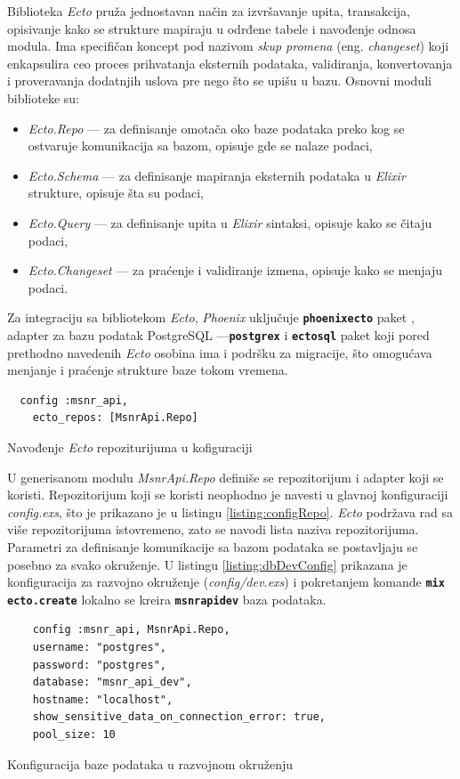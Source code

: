 \documentclass[12pt,oneside]{memoir}
\begin{document}
Biblioteka \emph{Ecto} pruža jednostavan način za izvršavanje upita, transakcija, opisivanje kako se strukture mapiraju
u odrđene tabele i navođenje odnosa modula. Ima specifičan koncept pod nazivom \emph{skup promena} (eng. \emph{changeset}) koji enkapsulira ceo
proces prihvatanja eksternih podataka, validiranja, konvertovanja i proveravanja dodatnjih uslova pre nego što se upišu u bazu. Osnovni moduli biblioteke su:
\begin{itemize}
  \item \emph{Ecto.Repo} --- za definisanje omotača oko baze podataka preko kog se ostvaruje komunikacija sa bazom, opisuje gde se nalaze podaci,
  \item \emph{Ecto.Schema} --- za definisanje mapiranja eksternih podataka u \emph{Elixir} strukture, opisuje šta su podaci,
  \item \emph{Ecto.Query} --- za definisanje upita u \emph{Elixir} sintaksi, opisuje kako se čitaju podaci,
  \item \emph{Ecto.Changeset} --- za praćenje i validiranje izmena, opisuje kako se menjaju podaci.
\end{itemize}
Za integraciju sa bibliotekom \emph{Ecto}, \emph{Phoenix} uključuje \texttt{\textbf{phoenix{\textunderscore}ecto}} paket
, adapter za bazu podatak PostgreSQL ---\texttt{\textbf{postgrex}} i \texttt{\textbf{ecto{\textunderscore}sql}} paket
koji pored prethodno navedenih \emph{Ecto} osobina ima i podršku za migracije, što omogućava menjanje i praćenje strukture
baze tokom vremena.
\begin{listing}[!h]
  \begin{verbatim}
  config :msnr_api,
    ecto_repos: [MsnrApi.Repo]
\end{verbatim}
\caption{Navođenje \emph{Ecto} repoziturijuma u kofiguraciji}
\label{listing:configRepo}
\end{listing}
U generisanom modulu \emph{MsnrApi.Repo} definiše se repozitorijum i adapter koji se koristi. Repozitorijum koji se koristi neophodno je navesti u
glavnoj konfiguraciji \emph{config.exs}, što je prikazano je u listingu \ref{listing:configRepo}. \emph{Ecto} podržava rad sa više repozitorijuma istovremeno, 
zato se navodi lista naziva repozitorijuma. Parametri za definisanje komunikacije sa bazom podataka se postavljaju se posebno za svako okruženje.
U listingu \ref{listing:dbDevConfig} prikazana je konfiguracija za razvojno okruženje (\emph{config/dev.exs}) i pokretanjem komande
\texttt{\textbf{mix ecto.create}} lokalno se kreira \texttt{\textbf{msnr{\textunderscore}api{\textunderscore}dev}} baza podataka. 
\begin{listing}[!h]
  \begin{verbatim}
    config :msnr_api, MsnrApi.Repo,
    username: "postgres",
    password: "postgres",
    database: "msnr_api_dev",
    hostname: "localhost",
    show_sensitive_data_on_connection_error: true,
    pool_size: 10
\end{verbatim}
\caption{Konfiguracija baze podataka u razvojnom okruženju}
\label{listing:dbDevConfig}
\end{listing}
\end{document}
